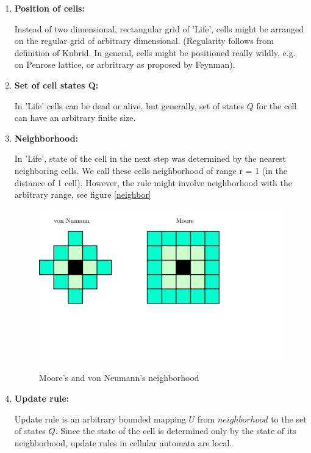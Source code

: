 \begin{enumerate}
\item \textbf{Position of cells:}

Instead of two dimensional, rectangular grid of 'Life',
cells might be arranged on the regular grid of arbitrary dimensional. 
(Regularity follows from definition of Kubrid. In general, cells might be positioned really wildly,
e.g. on Penrose lattice, or arbritrary as proposed by Feynman).

\item \textbf{Set of cell states Q:}

In 'Life' cells can be dead or alive, but generally, set of states $Q$ for the cell can have an arbitrary finite size.
\bigskip

\item \textbf{Neighborhood:}

In 'Life', state of the cell in the next step was determined
by the nearest neighboring cells. We call these cells neighborhood of range r = 1 (in the distance of 1 cell).
However, the rule might involve neighborhood with the arbitrary range, see figure \ref{neighbor}

\begin{figure}
 \centering
 \includegraphics[width=1\textwidth]{./img/neighb}
 \label{neighb}
 \caption{Moore's and von Neumann's neighborhood}
\end{figure}


\item \textbf{Update rule:}

Update rule is an arbitrary bounded mapping $U$ from $neighborhood$ to the set of states $Q$.
Since the state of the cell is determined only by the state of its neighborhood, update rules in cellular automata are local.

\end{enumerate}


